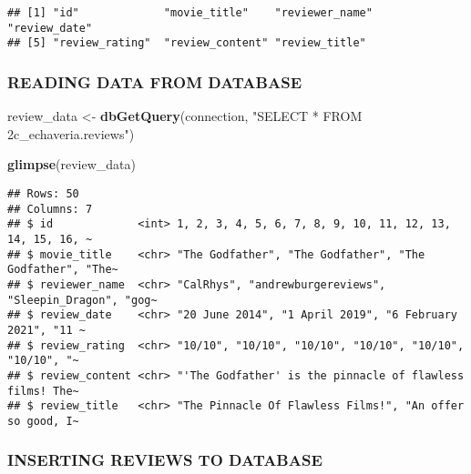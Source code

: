 \documentclass[
]{article}
\newenvironment{Shaded}{\begin{snugshade}}{\end{snugshade}}
\newcommand{\FunctionTok}[1]{\textcolor[rgb]{0.13,0.29,0.53}{\textbf{#1}}}
\newcommand{\NormalTok}[1]{#1}
\newcommand{\OtherTok}[1]{\textcolor[rgb]{0.56,0.35,0.01}{#1}}
\newcommand{\StringTok}[1]{\textcolor[rgb]{0.31,0.60,0.02}{#1}}
\begin{document}
\begin{verbatim}
## [1] "id"             "movie_title"    "reviewer_name"  "review_date"   
## [5] "review_rating"  "review_content" "review_title"
\end{verbatim}

\hypertarget{reading-data-from-database}{%
\subsubsection{READING DATA FROM
DATABASE}\label{reading-data-from-database}}

\begin{Shaded}
\begin{Highlighting}[]
\NormalTok{review\_data }\OtherTok{\textless{}{-}} \FunctionTok{dbGetQuery}\NormalTok{(connection, }\StringTok{"SELECT * FROM 2c\_echaveria.reviews"}\NormalTok{)}

\FunctionTok{glimpse}\NormalTok{(review\_data)}
\end{Highlighting}
\end{Shaded}

\begin{verbatim}
## Rows: 50
## Columns: 7
## $ id             <int> 1, 2, 3, 4, 5, 6, 7, 8, 9, 10, 11, 12, 13, 14, 15, 16, ~
## $ movie_title    <chr> "The Godfather", "The Godfather", "The Godfather", "The~
## $ reviewer_name  <chr> "CalRhys", "andrewburgereviews", "Sleepin_Dragon", "gog~
## $ review_date    <chr> "20 June 2014", "1 April 2019", "6 February 2021", "11 ~
## $ review_rating  <chr> "10/10", "10/10", "10/10", "10/10", "10/10", "10/10", "~
## $ review_content <chr> "'The Godfather' is the pinnacle of flawless films! The~
## $ review_title   <chr> "The Pinnacle Of Flawless Films!", "An offer so good, I~
\end{verbatim}

\hypertarget{inserting-reviews-to-database}{%
\subsubsection{INSERTING REVIEWS TO
DATABASE}\label{inserting-reviews-to-database}}
\end{document}
